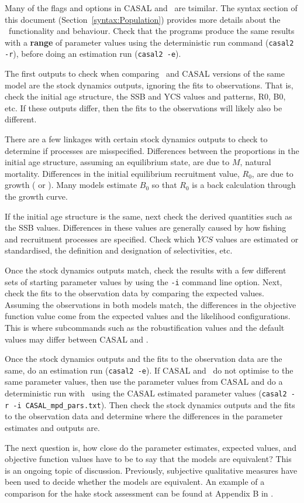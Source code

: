 Many of the flags and options in CASAL and \CNAME\ are tsimilar. The syntax section of this document (Section~\ref{syntax:Population}) provides more details about the \CNAME\ functionality and behaviour. Check that the programs produce the same results with a \textbf{range} of parameter values using the deterministic run command (\texttt{casal2 -r}), before doing an estimation run (\texttt{casal2 -e}).

The first outputs to check when comparing \CNAME\ and CASAL versions of the same model are the stock dynamics outputs, ignoring the fits to observations. That is, check the initial age structure, the SSB and YCS values and patterns, R0, B0, etc. If these outputs differ, then the fits to the observations will likely also be different.

There are a few linkages with certain stock dynamics outputs to check to determine if processes are misspecified. Differences between the proportions in the initial age structure, assuming an equilibrium state, are due to $M$, natural mortality. Differences in the initial equilibrium recruitment value, $R_0$, are due to growth ( or ). Many models estimate $B_0$ so that $R_0$ is a back calculation through the growth curve.

If the initial age structure is the same, next check the derived quantities such as the SSB values. Differences in these values are generally caused by how fishing and recruitment processes are specified. Check which $YCS$ values are estimated or standardised, the definition and designation of selectivities, etc.

Once the stock dynamics outputs match, check the results with a few different sets of starting parameter values by using the \texttt{-i} command line option. Next, check the fits to the observation data by comparing the expected values.  Assuming the observations in both models match, the differences in the objective function value come from the expected values and the likelihood configurations. This is where subcommands such as the robustification values and the default values may differ between CASAL and \CNAME.

Once the stock dynamics outputs and the fits to the observation data are the same, do an estimation run (\texttt{casal2 -e}). If CASAL and \CNAME\ do not optimise to the same parameter values, then use the parameter values from CASAL and do a deterministic run with \CNAME\ using the CASAL estimated parameter values (\texttt{casal2 -r -i CASAL\_mpd\_pars.txt}). Then check the stock dynamics outputs and the fits to the observation data and determine where the differences in the parameter estimates and outputs are.

The next question is, how close do the parameter estimates, expected values, and objective function values have to be to say that the models are equivalent? This is an ongoing topic of discussion.  Previously, subjective qualitative measures have been used to decide whether the models are equivalent. An example of a comparison for the hake stock assessment can be found at Appendix B in \cite{horn2017stock}.
